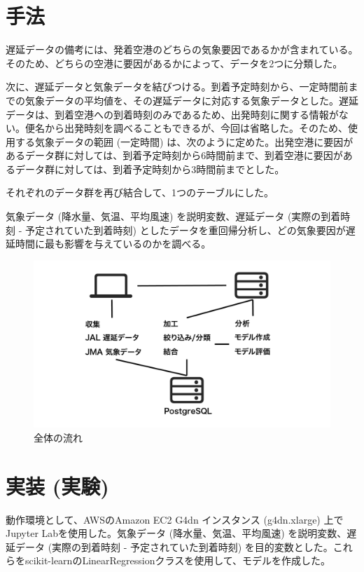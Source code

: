 \documentclass[12pt,a4paper,dvipdfmx,titlepage]{jsarticle}
\begin{document}
\section*{手法}

遅延データの備考には、発着空港のどちらの気象要因であるかが含まれている。そのため、どちらの空港に要因があるかによって、データを2つに分類した。

次に、遅延データと気象データを結びつける。到着予定時刻から、一定時間前までの気象データの平均値を、その遅延データに対応する気象データとした。遅延データは、到着空港への到着時刻のみであるため、出発時刻に関する情報がない。便名から出発時刻を調べることもできるが、今回は省略した。そのため、使用する気象データの範囲 (一定時間) は、次のように定めた。出発空港に要因があるデータ群に対しては、到着予定時刻から6時間前まで、到着空港に要因があるデータ群に対しては、到着予定時刻から3時間前までとした。

それぞれのデータ群を再び結合して、1つのテーブルにした。

気象データ (降水量、気温、平均風速) を説明変数、遅延データ (実際の到着時刻 - 予定されていた到着時刻) としたデータを重回帰分析し、どの気象要因が遅延時間に最も影響を与えているのかを調べる。

\begin{figure}[htbp]
    \begin{center}
        \includegraphics[width=12cm]{img/process.png}
        \caption{全体の流れ}
        \label{fig:process}
    \end{center}
\end{figure}

\section*{実装 (実験)}
動作環境として、AWSのAmazon EC2 G4dn インスタンス\cite{awsG4dn} (g4dn.xlarge) 上でJupyter Labを使用した。気象データ (降水量、気温、平均風速) を説明変数、遅延データ (実際の到着時刻 - 予定されていた到着時刻) を目的変数とした。これらをscikit-learnのLinearRegressionクラスを使用して、モデルを作成した。
\end{document}
